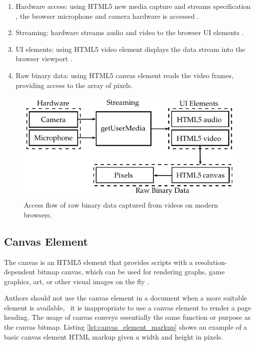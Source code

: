 \begin{enumerate}
  \item  Hardware access: using HTML5 \cite{Hickson2013} new media capture and streams specification \cite{MediaCapture2013}, the browser microphone and camera hardware is accessed \cite{WebRTC2013}.
  \item Streaming: hardware streams audio and video to the browser UI elements \cite{WebRTC2013}.
  \item UI elements: using HTML5 \cite{Hickson2013} video element displays the data stream into the browser viewport \cite{WC2006}.
  \item Raw binary data: using HTML5 \cite{Hickson2013} canvas element \cite{Canvas2013} reads the video frames, providing access to the array of pixels.
\end{enumerate}

\begin{figure}[!htb]
  \centering
  \includegraphics{chapters/basic_concepts/get_user_media.pdf}
  \caption{Access flow of raw binary data captured from videos on modern browsers.}
  \label{figure:get_user_media}
\end{figure}


\subsection{Canvas Element} %
\label{sub:basic_concepts:web:canvas_element}

The canvas \cite{Canvas2013} is an HTML5 \cite{Hickson2013} element that provides scripts with a resolution-dependent bitmap canvas, which can be used for rendering graphs, game graphics, art, or other visual images on the fly \cite{Canvas2013}.

Authors should not use the canvas element \cite{Canvas2013} in a document when a more suitable element is available, \eg\ it is inappropriate to use a canvas element \cite{Canvas2013} to render a page heading. The usage of canvas conveys essentially the same function or purpose as the canvas bitmap. Listing \ref{lst:canvas_element_markup} shows an example of a basic canvas element \cite{Canvas2013} HTML markup given a width and height in pixels.

